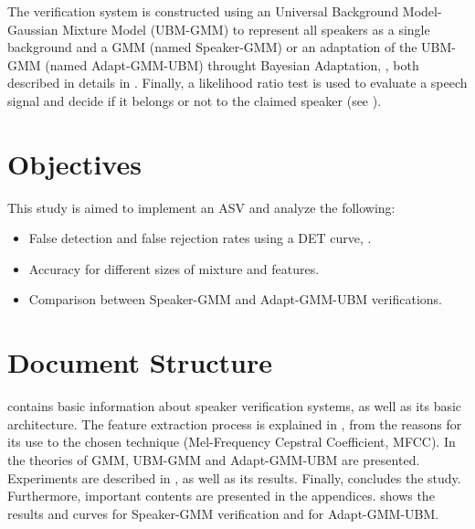 The verification system is constructed using an Universal Background Model-Gaussian Mixture Model (UBM-GMM) to represent all speakers as a single background and a GMM (named Speaker-GMM) or an adaptation of the UBM-GMM (named Adapt-GMM-UBM) throught Bayesian Adaptation, , both described in details in . Finally, a likelihood ratio test is used to evaluate a speech signal and decide if it belongs or not to the claimed speaker (see ).


\section{Objectives}

This study is aimed to implement an ASV and analyze the following:

\begin{itemize}\itemsep0pt
    \item False detection and false rejection rates using a DET curve, .
    \item Accuracy for different sizes of mixture and features.
    \item Comparison between Speaker-GMM and Adapt-GMM-UBM verifications.
\end{itemize}

\section{Document Structure}

 contains basic information about speaker verification systems, as well as its basic architecture. The feature extraction process is explained in , from the reasons for its use to the chosen technique (Mel-Frequency Cepstral Coefficient, MFCC). In  the theories of GMM, UBM-GMM and Adapt-GMM-UBM are presented. Experiments are described in , as well as its results. Finally,  concludes the study. Furthermore, important contents are presented in the appendices.  shows the results and curves for Speaker-GMM verification and  for Adapt-GMM-UBM.